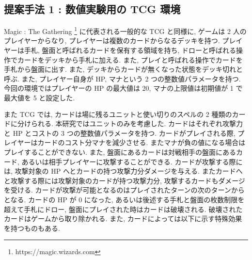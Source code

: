 \documentclass[twocolumn]{jarticle}
\begin{document}
\subsection{提案手法 1 : 数値実験用の TCG 環境}
Magic : The Gathering \footnote[2]{https://magic.wizards.com} に代表される一般的な TCG と同様に, ゲームは 2 人のプレイヤーからなり, プレイヤーは複数のカードからなるデッキを持つ. 
プレイヤーは手札, 盤面と呼ばれるカードを保有する領域を持ち, ドローと呼ばれる操作でカードをデッキから手札に加える. また, プレイと呼ばれる操作でカードを手札から盤面に出す. また, デッキからカードが無くなった状態をデッキ切れと呼ぶ.  
また, プレイヤー自身が HP, マナという 2 つの整数値パラメータを持つ.
今回の環境ではプレイヤーの HP の最大値は 20, マナの上限値は初期値が 1 で最大値を 5 と設定した.
\par
また TCG では, カードは場に残るユニットと使い切りのスペルの 2 種類のカードに分けられる. 本研究ではユニットのみを考慮した.
カードはそれぞれ攻撃力と HP とコストの 3 つの整数値パラメータを持つ. カードがプレイされる際, プレイヤーはカードのコスト分マナを減少させる. またマナが負の値になる場合はプレイすることができない.
また, 盤面にあるカードは対戦相手の盤面にあるカード, あるいは相手プレイヤーに攻撃することができる. カードが攻撃する際には, 攻撃対象の HP へとカードの持つ攻撃力分ダメージを与える. またカードへと攻撃する際には攻撃対象のカードが持つ攻撃力分, 攻撃するカードもダメージを受ける.
カードが攻撃が可能となるのはプレイされたターンの次のターンからとなる. 
カードの HP が 0 になった, あるいは後述する手札と盤面の枚数制限を超えて手札にドロー, 盤面にプレイされた時はカードは破壊される. 破壊されたカードはゲームから取り除かれる. 
また, カードによっては以下に示す特殊効果を持つものもある.
\end{document}
